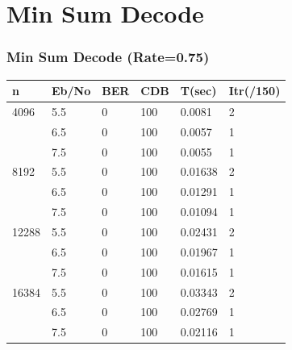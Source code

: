 \documentclass[xcolor=dvipsname]
{beamer}
\begin{document}
\section{Min Sum Decode}
\begin{frame}[t] 
\frametitle{Min Sum Decode (Rate=0.75)}
\begin{table}[]
\centering
\begin{tabular}{|l|l|l|l|l|l|}
\hline
n     & Eb/No & BER & CDB & T(sec)  & Itr(/150) \\ \hline
4096  & 5.5   & 0   & 100 & 0.0081  & 2         \\ 
      & 6.5   & 0   & 100 & 0.0057  & 1         \\
      & 7.5   & 0   & 100 & 0.0055  & 1         \\ \hline
8192  & 5.5   & 0   & 100 & 0.01638 & 2         \\ 
      & 6.5   & 0   & 100 & 0.01291 & 1         \\
      & 7.5   & 0   & 100 & 0.01094 & 1         \\ \hline
12288 & 5.5   & 0   & 100 & 0.02431 & 2         \\ 
      & 6.5   & 0   & 100 & 0.01967 & 1         \\ 
      & 7.5   & 0   & 100 & 0.01615 & 1         \\ \hline
16384 & 5.5   & 0   & 100 & 0.03343 & 2         \\ 
      & 6.5   & 0   & 100 & 0.02769 & 1         \\ 
      & 7.5   & 0   & 100 & 0.02116 & 1         \\ \hline
\end{tabular}
\end{table}
\end{frame}
\end{document}
